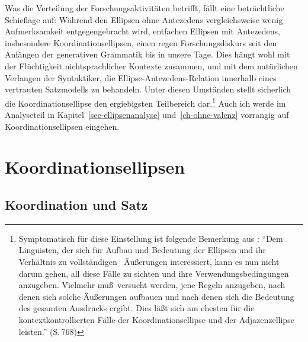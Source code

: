 Was die Verteilung der Forschungsaktivitäten betrifft, fällt eine beträchtliche Schieflage auf: Während den Ellipsen ohne Antezedens vergleichsweise wenig Aufmerksamkeit entgegengebracht wird, entfachen Ellipsen mit Antezedens, insbesondere Koordinationsellipsen, einen regen Forschungsdiskurs seit den Anfängen der generativen Grammatik bis in unsere Tage. Dies hängt wohl mit der Flüchtigkeit nichtsprachlicher Kontexte zusammen, und mit dem natürlichen Verlangen der Syntaktiker, die Ellipse-Antezedens-Relation innerhalb eines vertrauten Satzmodells zu behandeln. Unter diesen Umständen stellt sicherlich die Koordinationsellipse den ergiebigsten Teilbereich dar.\footnote{Symptomatisch für diese Einstellung ist folgende Bemerkung aus \cite{Klein:93}: "`Dem Linguisten, der sich für Aufbau und Bedeutung der Ellipsen und ihr Verhältnis zu \glq vollständigen\grq~ Äu\ss erungen interessiert, kann es nun nicht darum gehen, all diese Fälle zu sichten und ihre Verwendungsbedingungen anzugeben. Vielmehr mu\ss\ versucht werden, jene Regeln anzugeben, nach denen sich solche Äu\ss erungen aufbauen und nach denen sich die Bedeutung des gesamten Ausdrucks ergibt. Dies lä\ss t sich am ehesten für die kontextkontrollierten Fälle der Koordinationsellipse und der Adjazenzellipse leisten."' (S.\,768)} Auch ich werde im Analyseteil in Kapitel~\ref{sec-ellipsenanalyse} und~\ref{ch-ohne-valenz} vorrangig auf Koordinationsellipsen eingehen.  



\section{Koordinationsellipsen} \label{sec-koordinationsellipsen}

\subsection{Koordination und Satz}

